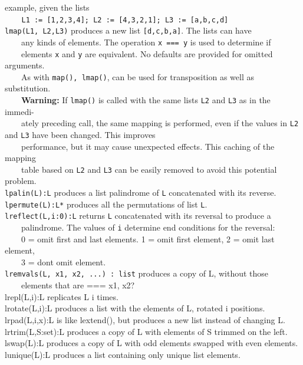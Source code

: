 example, given the lists\\
 \ \texttt{\ \ \ }\texttt{L1 := [1,2,3,4]; L2 := [4,3,2,1]; L3 :=
[{\textquotedbl}a{\textquotedbl},{\textquotedbl}b{\textquotedbl},{\textquotedbl}c{\textquotedbl},{\textquotedbl}d{\textquotedbl}]}\\
 \texttt{lmap(L1, L2,L3)} produces a new list
\texttt{[{\textquotedbl}d{\textquotedbl},{\textquotedbl}c{\textquotedbl},{\textquotedbl}b{\textquotedbl},{\textquotedbl}a{\textquotedbl}]}.
The lists can have\\
 \ \ \ \ any kinds of elements. The operation \texttt{x === y} is used to
determine if\\
 \ \ \ \ elements \texttt{x} and \texttt{y} are equivalent. No defaults are provided for omitted arguments.\\
 \ \ \ \ As
with \texttt{map(), lmap()}, can be used for transposition as well as substitution.\\
 \ \ \ \ \textbf{Warning: }If \texttt{lmap()} is called with
 the same lists \texttt{L2} and \texttt{L3} as in the
immedi-\\
 \ \ \ \ ately preceding call, the same mapping is performed, even if the values in \texttt{L2} and \texttt{L3}
have been changed. This improves\\
 \ \ \ \ performance, but it may cause unexpected effects. This
{\textquotedbl}caching{\textquotedbl} of the mapping\\
 \ \ \ \ table based on \texttt{L2} and \texttt{L3} can be easily
removed to avoid this potential problem.\\
\texttt{lpalin(L):L} produces a list palindrome of \texttt{L}
concatenated with its reverse.\\
\texttt{lpermute(L):L*} produces all the permutations of list
\texttt{L}.\\
\texttt{lreflect(L,i:0):L} returns \texttt{L} concatenated with its
reversal to produce a\\
 \ \ \ \ palindrome. The values of \texttt{i} determine
{\textquotedbl}end conditions{\textquotedbl} for the reversal:\\
 \ \ \ \ 0 = omit first and last elements. 1 = omit first element, 2 =
omit last element,\\
 \ \ \ \ 3 = don{\textquotesingle}t omit element.\\
\texttt{lremvals(L, x1, x2, ...) : list} produces a copy of L, without
those\\
 \ \ \ \ elements that are === x1, x2?\\
lrepl(L,i):L replicates L i
times.\\
lrotate(L,i):L produces a list with the elements of L, rotated i
positions.\\
lrpad(L,i,x):L is like lextend(), but produces a new list instead of
changing L.\\
lrtrim(L,S:set):L produces a copy of L with elements of S trimmed on the
left.\\
lswap(L):L produces a copy of L with odd elements swapped with even
elements.\\
lunique(L):L produces a list containing only unique list elements.

